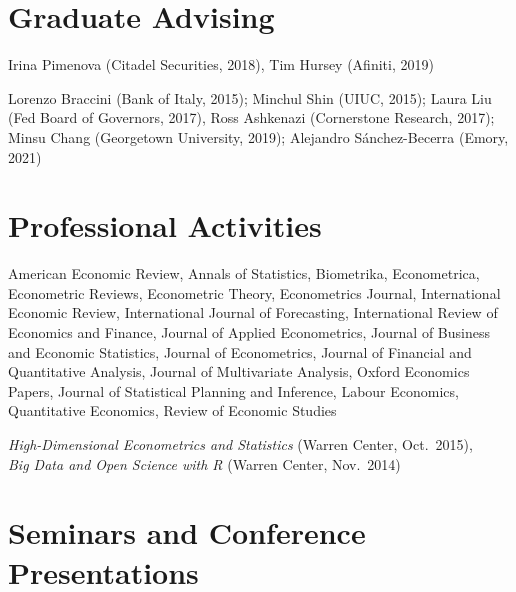 \documentclass[line,overlapped]{myres}
\begin{document}
\begin{resume}
\section{\sc Graduate Advising}
\begin{description}[style=multiline,leftmargin=3cm,font=\normalfont]
  \item[Main Supervisor:] Irina Pimenova (Citadel Securities, 2018), Tim Hursey (Afiniti, 2019)
  \item[Committee \\ Member:] Lorenzo Braccini (Bank of Italy, 2015); Minchul Shin (UIUC, 2015); Laura Liu (Fed Board of Governors, 2017), Ross Ashkenazi (Cornerstone Research, 2017); Minsu Chang (Georgetown University, 2019); Alejandro S\'{a}nchez-Becerra (Emory, 2021)
\end{description}


\section{\sc Professional Activities}

\begin{description}[style=multiline,leftmargin=3cm,font=\normalfont]
  \item[Refereeing:] American Economic Review, Annals of Statistics, Biometrika, Econometrica, Econometric Reviews, Econometric Theory, Econometrics Journal, International Economic Review, International Journal of Forecasting, International Review of Economics and Finance, Journal of Applied Econometrics, Journal of Business and Economic Statistics, Journal of Econometrics, Journal of Financial and Quantitative Analysis, Journal of Multivariate Analysis, Oxford Economics Papers, Journal of Statistical Planning and Inference, Labour Economics, Quantitative Economics, Review of Economic Studies 
  \item[Workshops \\ Organized:]
    \emph{High-Dimensional Econometrics and Statistics} (Warren Center, Oct.\ 2015), \\
    \emph{Big Data and Open Science with R} (Warren Center, Nov.\ 2014)
\end{description}



\section{\sc Seminars and Conference Presentations}


\end{resume}
\end{document}
